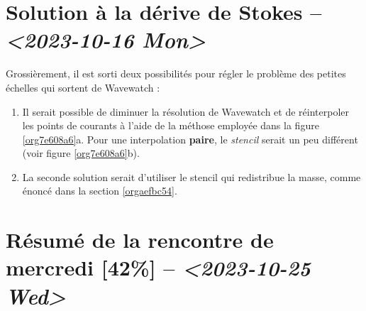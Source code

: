 \documentclass[10pt]{article}
\numberwithin{equation}{section}
\begin{document}
\section{Solution à la dérive de Stokes -- \textit{<2023-10-16 Mon>}}
\label{sec:org2649ce8}
Grossièrement, il est sorti deux possibilités pour régler le problème des petites échelles qui sortent de Wavewatch :
\begin{enumerate}
\item Il serait possible de diminuer la résolution de Wavewatch et de réinterpoler les points de courants à l'aide de la méthose employée dans la figure \ref{org7e608a6}a.
Pour une interpolation \textbf{paire}, le \emph{stencil} serait un peu différent (voir figure \ref{org7e608a6}b).

\item La seconde solution serait d'utiliser le stencil qui redistribue la masse, comme énoncé dans la section \ref{orgaefbc54}.
\end{enumerate}

\section{Résumé de la rencontre de mercredi [42\%]  -- \textit{<2023-10-25 Wed>}}
\label{sec:org5e46707}
\end{document}

